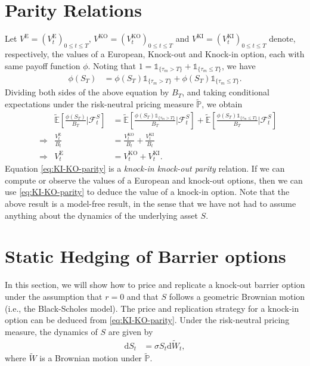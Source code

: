 \documentclass[12pt]{book}
\numberwithin{equation}{chapter}
\theoremstyle{plain}
\numberwithin{theorem}{section}
\theoremstyle{definition}
\numberwithin{exercise}{chapter}
\newcommand{\<}{\langle}
\renewcommand{\>}{\rangle}
\renewcommand{\(}{\left(}
\renewcommand{\)}{\right)}
\renewcommand{\[}{\left[}
\renewcommand{\]}{\right]}
\newcommand\Eb{\mathds{E}}
\newcommand\Pb{\mathds{P}}
\newcommand\Ib{\mathds{1}}
\newcommand\Fc{\mathscr{F}}
\newcommand\Ebt{\widetilde{\Eb}}
\newcommand\Pbt{\widetilde{\Pb}}
\newcommand\Wt{\widetilde{W}}
\newcommand\dd{\mathrm{d}}
\theoremstyle{definition}
\numberwithin{question}{section}
\begin{document}
\section{Parity Relations} 
Let $V^\text{E}=(V_t^\text{E})_{0 \leq t \leq T}$, $V^\text{KO}=(V_t^\text{KO})_{0 \leq t \leq T}$ and $V^\text{KI}=(V_t^\text{KI})_{0 \leq t \leq T}$ denote, respectively, the values of a European, Knock-out and Knock-in option, each with same payoff function $\phi$.  Noting that $1 = \Ib_{\{ \tau_m > T \}} + \Ib_{\{ \tau_m \leq T \}}$, we have
\begin{align}
\phi(S_T) &= \phi(S_T) \Ib_{\{ \tau_m > T \}} + \phi(S_T) \Ib_{\{ \tau_m \leq T \}} .
\end{align}
Dividing both sides of the above equation by $B_T$, and taking conditional expectations under the risk-neutral pricing measure $\Pbt$, we obtain
\begin{align}
	& &
\Ebt \[ \frac{\phi(S_T)}{B_T} \Big| \Fc_t^S \] 
	&= \Ebt \[ \frac{ \phi(S_T) \Ib_{\{ \tau_m > T \}} }{B_T} \Big| \Fc_t^S \] + \Ebt \[ \frac{ \phi(S_T) \Ib_{\{ \tau_m \leq T \}} }{B_T} \Big| \Fc_t^S \]  \\
	&\Rightarrow& 
\frac{V_t^\text{E} }{B_t}
	&= \frac{V_t^\text{KO}}{B_t} + \frac{V_t^\text{KI}}{B_t} \\
	&\Rightarrow& 
V_t^\text{E} 
	&= V_t^\text{KO} + V_t^\text{KI} . \label{eq:KI-KO-parity}
\end{align}
Equation \eqref{eq:KI-KO-parity} is a \textit{knock-in knock-out parity} relation.  
If we can compute or observe the values of a European and knock-out options, then we can use \eqref{eq:KI-KO-parity} to deduce the value of a knock-in option.
Note that the above result is a model-free result, in the sense that we have not had to assume anything about the dynamics of the underlying asset $S$.
 
\section{Static Hedging of Barrier options}
In this section, we will show how to price and replicate a knock-out barrier option under the assumption that $r = 0$ and that $S$ follows a geometric Brownian motion (i.e., the Black-Scholes model).  The price and replication strategy for a knock-in option can be deduced from \eqref{eq:KI-KO-parity}.  Under the risk-neutral pricing measure, the dynamics of $S$ are given by
\begin{align}
\dd S_t 
	&= \sigma S_t \dd \Wt_t , \label{eq:S.gbm}
\end{align}
where $\Wt$ is a Brownian motion under $\Pbt$.
\end{document}
